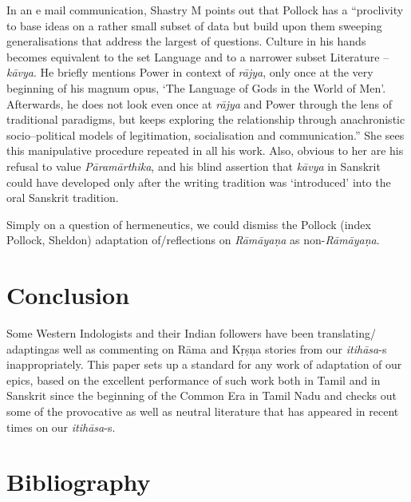  \item In an e mail communication, Shastry M points out that Pollock has a “proclivity to base ideas on a rather small subset of data but build upon them sweeping generalisations that address the largest of questions. Culture in his hands becomes equivalent to the set Language and to a narrower subset Literature – \textit{kāvya}. He briefly mentions Power in context of \textit{rājya}, only once at the very beginning of his magnum opus, ‘The Language of Gods in the World of Men’. Afterwards, he does not look even once at \textit{rājya} and Power through the lens of traditional paradigms, but keeps exploring the relationship through anachronistic socio–political models of legitimation, socialisation and communication.” She sees this manipulative procedure repeated in all his work. Also, obvious to her are his refusal to value \textit{Pāramārthika}, and his blind assertion that \textit{kāvya} in Sanskrit could have developed only after the writing tradition was ‘introduced’ into the oral Sanskrit tradition.

 \item Simply on a question of hermeneutics, we could dismiss the Pollock (index Pollock, Sheldon) adaptation of/reflections on \textit{Rāmāyaṇa} as non-\textit{Rāmāyaṇa}.



\section*{Conclusion}

Some Western Indologists and their Indian followers have been translating/ adaptingas well as commenting on Rāma and Kṛṣņa stories from our \textit{itihāsa}-s inappropriately. This paper sets up a standard for any work of adaptation of our epics, based on the excellent performance of such work both in Tamil and in Sanskrit since the beginning of the Common Era in Tamil Nadu and checks out some of the provocative as well as neutral literature that has appeared in recent times on our \textit{itihāsa}-s.


\section*{Bibliography}


